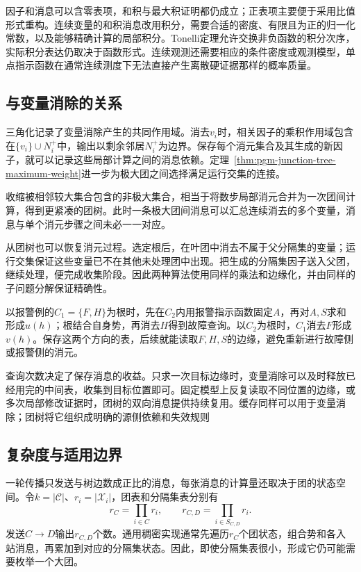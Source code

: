 因子和消息可以含零表项，和积与最大积证明都仍成立；正表项主要便于采用比值形式重构。连续变量的和积消息改用积分，需要合适的密度、有限且为正的归一化常数，以及能够精确计算的局部积分。Tonelli定理允许交换非负函数的积分次序，实际积分表达仍取决于函数形式。连续观测还需要相应的条件密度或观测模型，单点指示函数在通常连续测度下无法直接产生离散硬证据那样的概率质量。

\subsection{与变量消除的关系}
\label{sec:pgm-junction-tree-ve-relation}

三角化记录了变量消除产生的共同作用域。消去$v_i$时，相关因子的乘积作用域包含在$\{v_i\}\cup N_i^+$中，输出以剩余邻居$N_i^+$为边界。保存每个消元集合及其生成的新因子，就可以记录这些局部计算之间的消息依赖。定理~\ref{thm:pgm-junction-tree-maximum-weight}进一步为极大团之间选择满足运行交集的连接。

收缩被相邻较大集合包含的非极大集合，相当于将数步局部消元合并为一次团间计算，得到更紧凑的团树。此时一条极大团间消息可以汇总连续消去的多个变量，消息与单个消元步骤之间未必一一对应。

从团树也可以恢复消元过程。选定根后，在叶团中消去不属于父分隔集的变量；运行交集保证这些变量已不在其他未处理团中出现。把生成的分隔集因子送入父团，继续处理，便完成收集阶段。因此两种算法使用同样的乘法和边缘化，并由同样的子问题分解保证精确性。

以报警例的$C_1=\{F,H\}$为根时，先在$C_2$内用报警指示函数固定$A$，再对$A,S$求和形成$u(h)$；根结合自身势，再消去$H$得到故障查询。以$C_2$为根时，$C_1$消去$F$形成$v(h)$。保存这两个方向的表，后续就能读取$F,H,S$的边缘，避免重新进行故障侧或报警侧的消元。

查询次数决定了保存消息的收益。只求一次目标边缘时，变量消除可以及时释放已经用完的中间表，收集到目标位置即可。固定模型上反复读取不同位置的边缘，或多次局部修改证据时，团树的双向消息提供持续复用。缓存同样可以用于变量消除；团树将它组织成明确的源侧依赖和失效规则

\subsection{复杂度与适用边界}
\label{sec:pgm-junction-tree-complexity}

一轮传播只发送与树边数成正比的消息，每张消息的计算量还取决于团的状态空间。令$k=|\mathcal C|$、$r_i=|\mathcal X_i|$，团表和分隔集表分别有
\begin{equation}
  r_C=\prod_{i\in C}r_i,\qquad
  r_{C,D}=\prod_{i\in S_{C,D}}r_i.
  \label{eq:pgm-junction-tree-table-sizes}
\end{equation}
发送$C\to D$输出$r_{C,D}$个数。通用稠密实现通常先遍历$r_C$个团状态，组合势和各入站消息，再累加到对应的分隔集状态。因此，即使分隔集表很小，形成它仍可能需要枚举一个大团。

